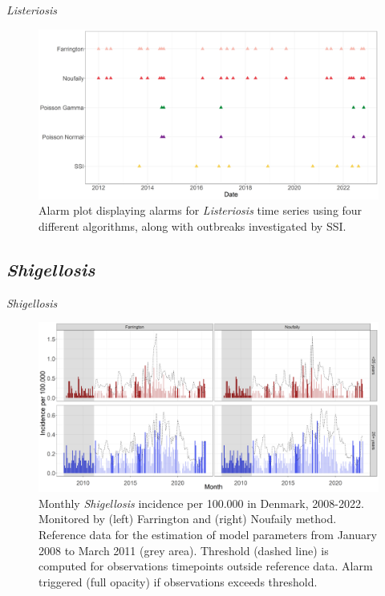 \documentclass[aspectratio=169]{beamer}
\begin{document}
\begin{frame}{\emph{Listeriosis}}
\protect\hypertarget{listeriosis-2}{}
\tiny

\begin{figure}[H]
\includegraphics[width=0.7\linewidth]{../figures/Compare_alarms_LIST} \caption{Alarm plot displaying alarms for \textit{Listeriosis} time series using four different algorithms, along with outbreaks investigated by SSI.}\label{fig:CompareAlarmsLIST}
\end{figure}

\normalsize
\end{frame}

\hypertarget{shigellosis}{%
\subsection{\texorpdfstring{\emph{Shigellosis}}{Shigellosis}}\label{shigellosis}}

\begin{frame}{\emph{Shigellosis}}
\tiny

\begin{figure}[H]
\includegraphics[width=0.7\linewidth]{../figures/Compare_stateOfTheArt_SHIG} \caption{Monthly \textit{Shigellosis} incidence per 100.000 in Denmark, 2008-2022. Monitored by (left) Farrington and (right) Noufaily method. Reference data for the estimation of model parameters from January 2008 to March 2011 (grey area). Threshold (dashed line) is computed for observations timepoints outside reference data. Alarm triggered (full opacity) if observations exceeds threshold. }\label{fig:CompareStateOfTheArtSHIG}
\end{figure}

\normalsize
\end{frame}
\end{document}
